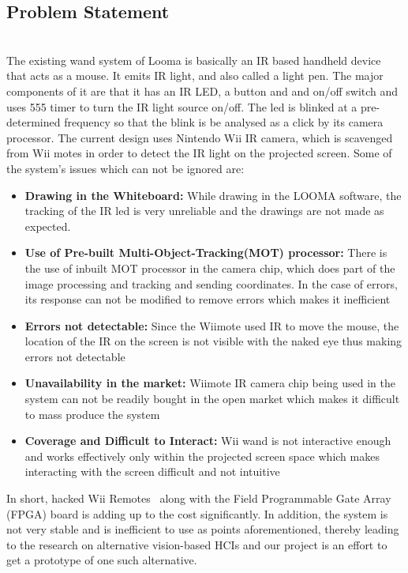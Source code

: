 \documentclass[12pt, a4paper]{article}
\begin{document}
\subsection{Problem Statement}
~\\
The existing wand system of Looma is basically an IR based handheld device that acts as a mouse. It emits IR light, and also called a light pen. The major components of it are that it has an IR LED, a button and and on/off switch and uses 555 timer to turn the IR light source on/off. The led is blinked at a pre-determined frequency so that the blink is be analysed as a click by its camera processor. The current design uses Nintendo Wii IR camera, which is scavenged from Wii motes in order to detect the IR light on the projected screen. Some of the system's issues which can not be ignored are:

\begin{itemize}
\item \textbf {Drawing in the Whiteboard:} While drawing in the LOOMA software, the tracking of the IR led is very unreliable and the drawings are not made as expected.
\item \textbf{Use of Pre-built Multi-Object-Tracking(MOT) processor:} There is the use of inbuilt MOT processor in the camera chip, which does part of the image processing and tracking and sending coordinates. In the case of errors, its response can not be modified to remove errors which makes it inefficient
\item \textbf{Errors not detectable:} Since the Wiimote used IR to move the mouse, the location of the IR on the screen is not visible with the naked eye thus making errors not detectable 
\item \textbf{Unavailability in the market:} Wiimote IR camera chip being used in the system can not be readily bought in the open market which makes it difficult to mass produce the system
\item \textbf{Coverage and Difficult to Interact:} Wii wand is not interactive enough and works effectively only within the projected screen space which makes interacting with the screen difficult and not intuitive
\end{itemize}

In short, hacked Wii Remotes~\cite{joh} along with the Field Programmable Gate Array (FPGA) board is adding up to the cost significantly. In addition, the system is not very stable and is inefficient to use as points aforementioned, thereby leading to the research on alternative vision-based HCIs and our project is an effort to get
a prototype of one such alternative.
\end{document}
